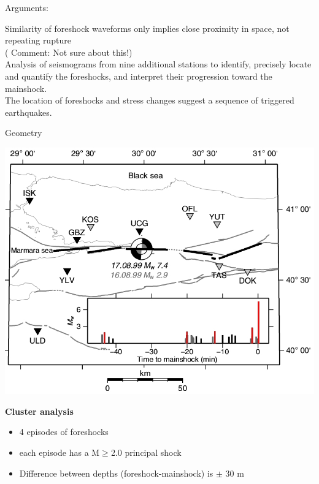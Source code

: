 \documentclass[aspectratio=43,9pt]{beamer}
\begin{document}
\begin{frame}{Arguments:}
 
 Similarity of foreshock waveforms only implies close proximity in space, not repeating rupture \\
 \hfill {(\color{Red} Comment: Not sure about this!)} \\
 \vskip 0.5cm
 Analysis of seismograms from nine additional stations to identify, precisely 
 locate and quantify the foreshocks, and interpret their progression toward the mainshock.\\
 \vskip 0.7cm
 The location of foreshocks and stress changes suggest a sequence of triggered earthquakes.
\end{frame}



\begin{frame}{Geometry}
 
 \begin{minipage}{0.5\linewidth}
   \includegraphics[width=1\linewidth]{Figs/fig_1ells.jpg}
 \end{minipage}
 \begin{minipage}{0.48\linewidth}
 {\bf Cluster analysis}
 \begin{itemize}
  \item 4 episodes of foreshocks
  \item each episode has a M$\ge$2.0 principal shock
  \item Difference between depths (foreshock-mainshock) is $\pm$ 30 m
 \end{itemize}
 
 \end{minipage}

 
\end{frame}
\end{document}
